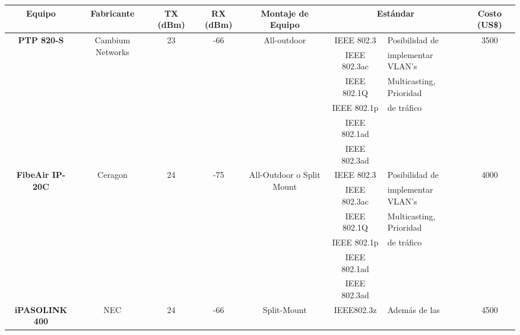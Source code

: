 \begin{table}[H]
  \tiny
  \centering
    \begin{tabular}{|c|c|c|c|c|c|p{11em}|c|}
    \hline
    \rowcolor[rgb]{ .773,  .851,  .945} \textbf{Equipo} & \textbf{Fabricante} & \textbf{TX (dBm)} & \textbf{RX (dBm)} & \textbf{Montaje de Equipo} & \multicolumn{2}{c|}{\textbf{Estándar }} & \textbf{Costo (US\$)} \bigstrut\\
    \hline
    \multirow{6}[2]{*}{\textbf{PTP 820-S}} & \multirow{6}[2]{*}{Cambium Networks} & \multirow{6}[2]{*}{23} & \multirow{6}[2]{*}{-66} & \multirow{6}[2]{*}{All-outdoor} & IEEE 802.3 & Posibilidad de & \multirow{6}[2]{*}{3500} \bigstrut[t]\\
          &       &       &       &       & IEEE 802.3ac & implementar VLAN's &  \\
          &       &       &       &       & IEEE 802.1Q & Multicasting, Prioridad &  \\
          &       &       &       &       & IEEE 802.1p & de tráfico &  \\
          &       &       &       &       & IEEE 802.1ad & \multicolumn{1}{c|}{} &  \\
          &       &       &       &       & IEEE 802.3ad & \multicolumn{1}{c|}{} &  \bigstrut[b]\\
    \hline
    \multirow{6}[2]{*}{\textbf{FibeAir IP-20C}} & \multirow{6}[2]{*}{Ceragon} & \multirow{6}[2]{*}{24} & \multirow{6}[2]{*}{-75} & \multicolumn{1}{c|}{\multirow{6}[2]{*}{All-Outdoor \newline{}o \newline{}Split Mount}} & IEEE 802.3 & Posibilidad de & \multirow{6}[2]{*}{4000} \bigstrut[t]\\
          &       &       &       &       & IEEE 802.3ac & implementar VLAN's &  \\
          &       &       &       &       & IEEE 802.1Q & Multicasting, Prioridad &  \\
          &       &       &       &       & IEEE 802.1p & de tráfico &  \\
          &       &       &       &       & IEEE 802.1ad & \multicolumn{1}{c|}{} &  \\
          &       &       &       &       & IEEE 802.3ad & \multicolumn{1}{c|}{} &  \bigstrut[b]\\
    \hline
    \multirow{9}[2]{*}{\textbf{iPASOLINK 400}} & \multirow{9}[2]{*}{NEC} & \multirow{9}[2]{*}{24} & \multirow{9}[2]{*}{-66} & \multirow{9}[2]{*}{Split-Mount} & IEEE802.3z & Además de las  & \multirow{9}[2]{*}{4500} \bigstrut[t]\\

\end{tabular}
\end{table}
